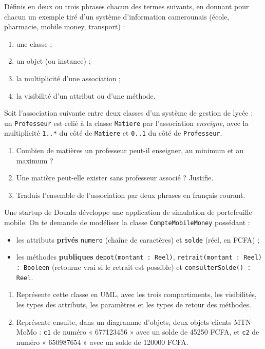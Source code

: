 \documentclass[11pt]{article}
\newcommand{\cle}[1]{{\popxbold\color{popdark}#1}}
\newcounter{popsec}
\newcounter{popsub}
\newcommand{\courssub}[1]{%
  \stepcounter{popsub}%
  \par\vspace{9pt}\noindent{\popxbold\fontsize{11.5}{13}\selectfont\color{popink}{\color{poporange}\thepopsec.\thepopsub}\hspace{6pt}#1}\par\nopagebreak\vspace{4pt}
}
\begin{document}
\begin{exercice}[Définitions]
Définis en deux ou trois phrases chacun des termes suivants, en donnant pour chacun un exemple tiré d'un système d'information camerounais (école, pharmacie, mobile money, transport) :
\begin{enumerate}
  \item une \cle{classe} ;
  \item un \cle{objet} (ou instance) ;
  \item la \cle{multiplicité} d'une association ;
  \item la \cle{visibilité} d'un attribut ou d'une méthode.
\end{enumerate}
\end{exercice}

\begin{exercice}
Soit l'association suivante entre deux classes d'un système de gestion de lycée : un \texttt{Professeur} est relié à la classe \texttt{Matiere} par l'association \emph{enseigne}, avec la multiplicité \texttt{1..*} du côté de \texttt{Matiere} et \texttt{0..1} du côté de \texttt{Professeur}.
\begin{enumerate}
  \item Combien de matières un professeur peut-il enseigner, au minimum et au maximum ?
  \item Une matière peut-elle exister sans professeur associé ? Justifie.
  \item Traduis l'ensemble de l'association par deux phrases en français courant.
\end{enumerate}
\end{exercice}

\courssub{Je m'entraîne}

\begin{exercice}
Une startup de Douala développe une application de simulation de portefeuille mobile. On te demande de modéliser la classe \texttt{CompteMobileMoney} possédant :
\begin{itemize}
  \item les attributs \textbf{privés} \texttt{numero} (chaîne de caractères) et \texttt{solde} (réel, en FCFA) ;
  \item les méthodes \textbf{publiques} \texttt{depot(montant : Reel)}, \texttt{retrait(montant : Reel) : Booleen} (retourne vrai si le retrait est possible) et \texttt{consulterSolde() : Reel}.
\end{itemize}
\begin{enumerate}
  \item Représente cette classe en UML, avec les trois compartiments, les visibilités, les types des attributs, les paramètres et les types de retour des méthodes.
  \item Représente ensuite, dans un diagramme d'objets, deux objets clients MTN MoMo : \texttt{c1} de numéro « 677123456 » avec un solde de \num{45250} FCFA, et \texttt{c2} de numéro « 650987654 » avec un solde de \num{120000} FCFA.
\end{enumerate}
\end{exercice}
\end{document}
